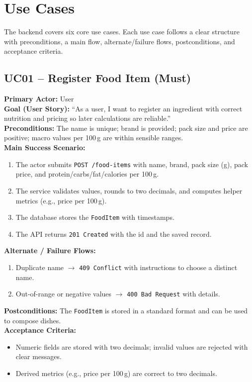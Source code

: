 \documentclass[11pt]{article}
\begin{document}
\section{Use Cases}

The backend covers six core use cases. Each use case follows a clear structure with preconditions, a main flow, alternate/failure flows, postconditions, and acceptance criteria.

\subsection*{UC01 -- Register Food Item (Must)}
\textbf{Primary Actor:} User\\
\textbf{Goal (User Story):} ``As a user, I want to register an ingredient with correct nutrition and pricing so later calculations are reliable.''\\
\textbf{Preconditions:} The name is unique; brand is provided; pack size and price are positive; macro values per 100\,g are within sensible ranges.\\
\textbf{Main Success Scenario:}
\begin{enumerate}[label=\arabic*.]
  \item The actor submits \texttt{POST /food-items} with name, brand, pack size (g), pack price, and protein/carbs/fat/calories per 100\,g.
  \item The service validates values, rounds to two decimals, and computes helper metrics (e.g., price per 100\,g).
  \item The database stores the \texttt{FoodItem} with timestamps.
  \item The API returns \texttt{201 Created} with the id and the saved record.
\end{enumerate}
\textbf{Alternate / Failure Flows:}
\begin{enumerate}[label=\arabic*F.]
  \item Duplicate name $\rightarrow$ \texttt{409 Conflict} with instructions to choose a distinct name.
  \item Out-of-range or negative values $\rightarrow$ \texttt{400 Bad Request} with details.
\end{enumerate}
\textbf{Postconditions:} The \texttt{FoodItem} is stored in a standard format and can be used to compose dishes.\\
\textbf{Acceptance Criteria:}
\begin{itemize}[noitemsep]
  \item Numeric fields are stored with two decimals; invalid values are rejected with clear messages.
  \item Derived metrics (e.g., price per 100\,g) are correct to two decimals.
\end{itemize}
\end{document}
